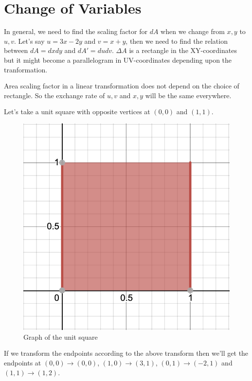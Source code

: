\section{Change of Variables}

In general, we need to find the scaling factor for $dA$ when we change from $x, y$ to $u, v$.
Let's say $u = 3x - 2y$ and $v = x + y$, then we need to find the relation between $dA = dx dy$ and $dA' = du dv$.
$\Delta A$ is a rectangle in the XY-coordinates but it might become a parallelogram in UV-coordinates depending upon the tranformation.

Area scaling factor in a linear transformation does not depend on the choice of rectangle.
So the exchange rate of $u, v$ and $x, y$ will be the same everywhere.

\pagebreak

Let's take a unit square with opposite vertices at $(0, 0)$ and $(1, 1)$.

\begin{figure}[ht!]
    \centering
    \includegraphics[scale=0.5]{./images/lecture_14_figure_2.png}
    \caption{Graph of the unit square}
\end{figure}

If we transform the endpoints according to the above transform then we'll get the endpoints
at $(0,0) \to (0,0)$, $(1, 0) \to (3, 1)$, $(0, 1) \to (-2, 1)$ and $(1, 1) \to (1, 2)$.

